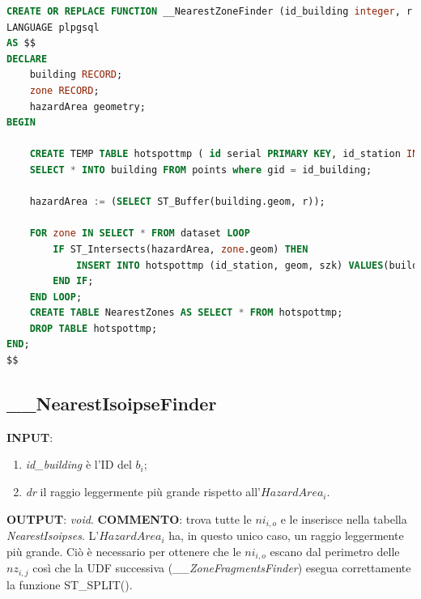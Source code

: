 \begin{lstlisting}[language=SQL]
CREATE OR REPLACE FUNCTION __NearestZoneFinder (id_building integer, r integer) RETURNS void
LANGUAGE plpgsql
AS $$
DECLARE
	building RECORD;
	zone RECORD;
	hazardArea geometry;
BEGIN

	CREATE TEMP TABLE hotspottmp ( id serial PRIMARY KEY, id_station INTEGER, geom Geometry, szk FLOAT  ) ON COMMIT DROP;
	SELECT * INTO building FROM points where gid = id_building;

	hazardArea := (SELECT ST_Buffer(building.geom, r));

	FOR zone IN SELECT * FROM dataset LOOP
		IF ST_Intersects(hazardArea, zone.geom) THEN
			INSERT INTO hotspottmp (id_station, geom, szk) VALUES(building.gid, ST_Intersection(hazardArea, zone.geom), zone.szk );
		END IF;
	END LOOP;
	CREATE TABLE NearestZones AS SELECT * FROM hotspottmp;
	DROP TABLE hotspottmp;
END;
$$
\end{lstlisting}

\subsection{\_\_NearestIsoipseFinder}

\textbf{INPUT}: 
\begin{enumerate}
	\item \textit{id\_building} è l'ID del $b_i$;
	\item \textit{dr} il raggio leggermente più grande rispetto all'$HazardArea_i$.
\end{enumerate}
\textbf{OUTPUT}: \textit{void}. \newline
\textbf{COMMENTO}: trova tutte le $ni_{i,o}$ e le inserisce nella tabella \textit{NearestIsoipses}. L'$HazardArea_i$ ha, in questo unico caso, un raggio leggermente più grande. Ciò è necessario per ottenere che le $ni_{i,o}$ escano dal perimetro delle $nz_{i,j}$ così che la UDF successiva (\textit{\_\_ZoneFragmentsFinder}) esegua correttamente la funzione ST\_SPLIT(). 

